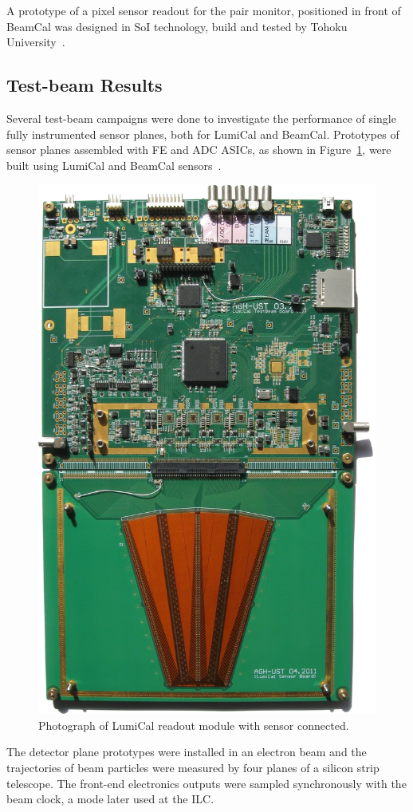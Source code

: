 A prototype of a pixel sensor readout for the pair monitor, positioned in front of BeamCal was designed in SoI
technology, build and tested
by Tohoku University~\cite{Sato201153}.


\subsection{Test-beam Results}


Several test-beam campaigns were done to investigate the performance of single fully instrumented sensor planes,
both for LumiCal and BeamCal.
Prototypes of sensor planes assembled with FE and ADC ASICs,
as shown in Figure~\ref{fig:fcal_lumical_module_photo},
were built using LumiCal and BeamCal sensors~\cite{1748-0221-7-01-T01004}.
\begin{figure}[h!]
\centering
\includegraphics[width=0.35\columnwidth,angle=90]{Calorimeter/FCAL/figs/tb3_complete_module}
\caption{Photograph of LumiCal readout module with sensor connected.}
\label{fig:fcal_lumical_module_photo}
\end{figure}
The detector plane prototypes were installed in an electron beam and
the trajectories of beam particles were measured by four planes of a silicon strip
telescope.
The front-end electronics outputs were sampled synchronously with the
beam clock, a mode later used at the ILC.
